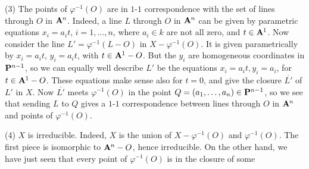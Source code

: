 {(3) The points of $\varphi^{-1}(O)$ are in $1$-$1$ correspondence with the set of lines through $O$ in $\AffSpace{n}$. Indeed, a line $L$ through $O$ in $\AffSpace{n}$ can be given by parametric equations $x_i=a_i t$, $i=1,\ldots,n$, where $a_i\in k$ are not all zero, and $t\in\AffSpace{1}$. Now consider the line $L'=\varphi^{-1}(L-O)$ in $X-\varphi^{-1}(O)$. It is given parametrically by $x_i=a_i t$, $y_i=a_i t$, with $t\in\AffSpace{1}-O$. But the $y_i$ are homogeneous coordinates in $\mathbf{P}^{n-1}$, so we can equally well describe $L'$ be the equations $x_i=a_i t,y_i=a_i$, for $t\in\AffSpace{1}-O$. These equations make sense also for $t=0$, and give the closure $\overline{L'}$ of $L'$ in $X$. Now $\overline{L'}$ meets $\varphi^{-1}(O)$ in the point $Q=(a_1,\ldots,a_n)\in\mathbf{P}^{n-1}$, so we see that sending $L$ to $Q$ gives a $1$-$1$ correspondence between lines through $O$ in $\AffSpace{n}$ and points of $\varphi^{-1}(O)$.

(4) $X$ is irreducible. Indeed, $X$ is the union of $X-\varphi^{-1}(O)$ and $\varphi^{-1}(O)$. The first piece is isomorphic to $\AffSpace{n}-O$, hence irreducible. On the other hand, we have just seen that every point of $\varphi^{-1}(O)$ is in the closure of some%
}
